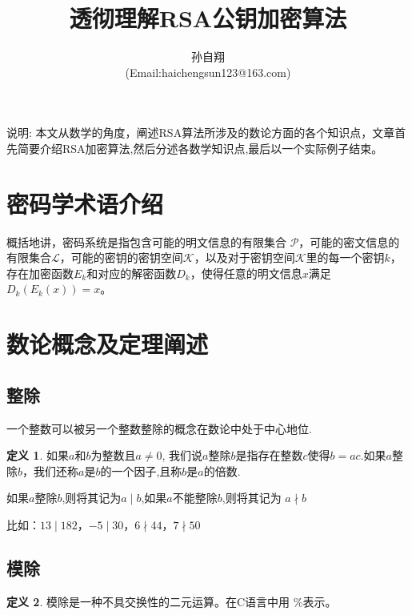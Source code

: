 \documentclass{article}
\title{\huge{透彻理解RSA公钥加密算法} }
\author{孙自翔\\[2pt]
(Email:haichengsun123@163.com) \\[2pt]}
\date{}  %
\theoremstyle{definition}
\newtheorem{dfn}{定义}[section]
\theoremstyle{remark}
\theoremstyle{plain}
\begin{document}
\maketitle

\tableofcontents
{} %

\newpage



说明: 本文从数学的角度，阐述RSA算法所涉及的数论方面的各个知识点，文章首先简要介绍RSA加密算法,然后分述各数学知识点,最后以一个实际例子结束。
% 
\section{密码学术语介绍}
% 
\hspace*{6mm}
概括地讲\cite{BOOK:1}，密码系统是指包含可能的明文信息的有限集合 $\mathscr{P}$，可能的密文信息的有限集合$\mathscr{L}$，可能的密钥的密钥空间$\mathscr{K}$，以及对于密钥空间$\mathscr{K}$里的每一个密钥$k$，存在加密函数$E_k$和对应的解密函数$D_k$，使得任意的明文信息$x$满足$D_k(E_k(x))=x$。


\section{数论概念及定理阐述}
\subsection{整除}   

一个整数可以被另一个整数整除的概念在数论中处于中心地位.
\begin{dfn}
如果$a$和$b$为整数且$a \neq 0$, 我们说$a$整除$b$是指存在整数$c$使得$b=ac$.如果$a$整除$b$，我们还称$a$是$b$的一个因子,且称$b$是$a$的倍数.
\end{dfn}
如果$a$整除$b$,则将其记为$a \mid b$,如果$a$不能整除$b$,则将其记为 $a \nmid b$

比如：$13 \mid 182$，$-5\mid30$，$6 \nmid 44$，$7 \nmid 50$

\subsection{模除}   
\begin{dfn}
模除\cite{WEBSITE:modulo}是一种不具交换性的二元运算。在C语言中用 $\%$表示。
\end{dfn}
\end{document}
